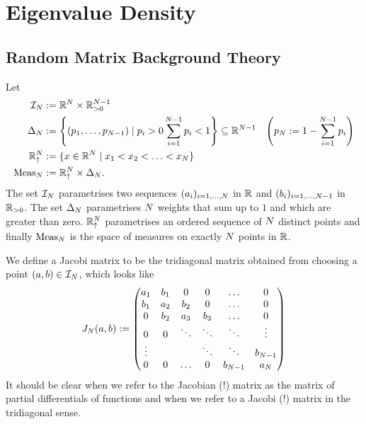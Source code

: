 
\section{Eigenvalue Density}

\subsection{Random Matrix Background Theory}

\begin{definition}[Spaces]\label{def: differenSpacesForRMT}
    Let 
    \begin{align*}
        \mathcal{I}_N & := \mathbb{R}^N\times\mathbb{R}^{N-1}_{>0} \\
        \Delta_N & := \left\{ (p_1, \ldots, p_{N-1}) \mid p_i > 0 \sum_{i=1}^{N-1}p_i < 1 \right\} \subseteq \mathbb{R}^{N-1} & \left( p_N := 1-\sum_{i=1}^{N-1} p_i \right) \\
        \mathbb{R}_{\uparrow}^N & := \{ x\in\mathbb{R}^N \mid x_1 < x_2 < \ldots < x_N \} \\
        \operatorname{Meas}_N & := \mathbb{R}_{\uparrow}^N \times \Delta_N.
    \end{align*}
    The set $\mathcal{I}_N$ parametrises two sequences $(a_i)_{i=1,\ldots,N}$ in $\mathbb{R}$ and $(b_i)_{i=1,\ldots,N-1}$ in $\mathbb{R}_{>0}$. The set $\Delta_N$ parametrises $N$ weights that sum up to $1$ and which are greater than zero. $\mathbb{R}_{\uparrow}^N$ parametrises an ordered sequence of $N$ distinct points and finally $\operatorname{Meas}_N$ is the space of measures on exactly $N$ points in $\mathbb{R}$.
\end{definition}

\begin{definition}
    We define a Jacobi matrix to be the tridiagonal matrix obtained from choosing a point $(a,b) \in \mathcal{I}_N$, which looks like
    \begin{align*}
        J_N(a,b) :=
        \begin{pmatrix}
            a_1    & b_1 & 0      & 0      & \ldots           & 0                \\
            b_1    & a_2 & b_2    & 0      & \ldots           & 0                \\
            0      & b_2 & a_3    & b_3    & \ldots           & 0                \\
            0      & 0   & \ddots & \ddots & \ddots           & \vdots           \\
            \vdots &     &        & \ddots & \ddots           & b_{N-1} \\
            0      &  0  & \ldots & 0      & b_{N-1} & a_{N}   
        \end{pmatrix}
    \end{align*}
    It should be clear when we refer to the Jacobian (!) matrix as the matrix of partial differentials of functions and when we refer to a Jacobi (!) matrix in the tridiagonal sense.
\end{definition}

